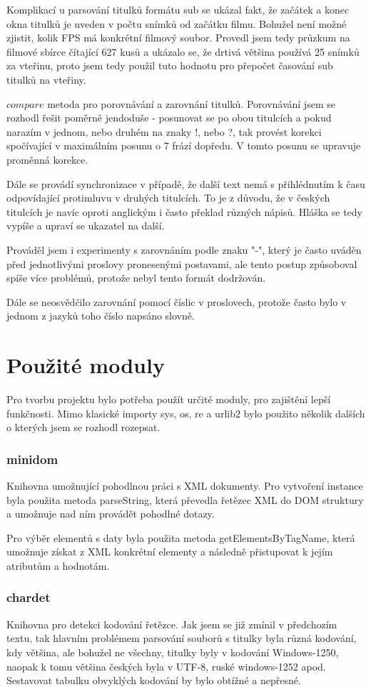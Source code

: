 \documentclass[a4paper,12]{article}
\begin{document}
Komplikací u parsování titulků formátu sub se ukázal fakt, že začátek a konec okna titulků je uveden v počtu snímků od začátku filmu. Bohužel není možné zjistit, kolik FPS má konkrétní filmový soubor. Provedl jsem tedy průzkum na filmové sbírce čítající 627 kusů a ukázalo se, že drtivá většina používá 25 snímků za vteřinu, proto jsem tedy použil tuto hodnotu pro přepočet časování sub titulků na vteřiny.

$compare$ metoda pro porovnávání a zarovnání titulků. Porovnávání jsem se rozhodl řešit poměrně jendoduše - posunovat se po obou titulcích a pokud narazím v jednom, nebo druhém na znaky !, nebo ?, tak provést korekci spočívající v maximálním posunu o 7 frází dopředu. V tomto posunu se upravuje proměnná korekce.

Dále se provádí synchronizace v případě, že další text nemá s přihlédnutím k času odpovídající protimluvu v druhých titulcích. To je z důvodu, že v českých titulcích je navíc oproti anglickým i často překlad různých nápisů. Hláška se tedy vypíše a upraví se ukazatel na další.

Prováděl jsem i experimenty s zarovnáním podle znaku "-", který je často uváděn před jednotlivými proslovy pronesenými postavami, ale tento postup způsoboval spíše více problémů, protože nebyl tento formát dodržován.

Dále se neosvědčilo zarovnání pomocí číslic v proslovech, protože často bylo v jednom z jazyků toho číslo napsáno slovně.


\pagebreak
\part*{Použité moduly}
Pro tvorbu projektu bylo potřeba použít určité moduly, pro zajištění lepší funkčnosti. Mimo klasické importy sys, os, re a urlib2 bylo použito několik dalších o kterých jsem se rozhodl rozepsat.

\section*{minidom}
Knihovna umožnující pohodlnou práci s XML dokumenty. Pro vytvoření instance byla použita metoda parseString, která převedla řetězec XML do DOM struktury a umožnuje nad ním provádět pohodlné dotazy.

Pro výběr elementů s daty byla použita metoda getElementsByTagName, která umožnuje získat z XML konkrétní elementy a následně přistupovat k jejím atributům a hodnotám.

\section*{chardet}
Knihovna pro detekci kodování řetězce. Jak jsem se již zmínil v předchozím textu, tak hlavním problémem parsování souborů s titulky byla různá kodování, kdy většina, ale bohužel ne všechny, titulky byly v kodování Windows-1250, naopak k tomu většina českých byla v UTF-8, ruské windows-1252 apod. Sestavovat tabulku obvyklých kodování by bylo obtížné a nepřesné.
\end{document}
